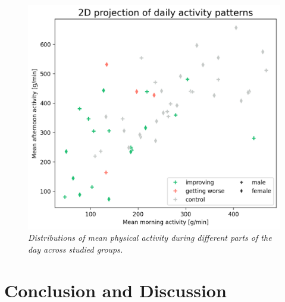 \documentclass[12pt]{article}
\begin{document}
\begin{figure}[!t]
    \centering
    \includegraphics[width=.99\textwidth]{images/2d_act.png}
    \captionsetup{justification=centering}
    \caption{\textit{Distributions of mean physical activity during different parts of the day across studied groups.}}
    \label{fig:2d_act}
\end{figure}



\section{Conclusion and Discussion}




\end{document}
